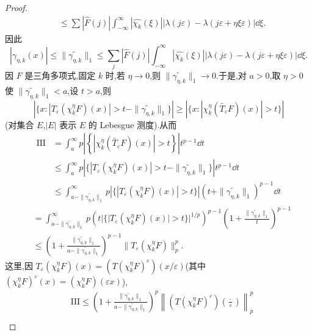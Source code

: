 \begin{proof}
\begin{align*}
&\leq \sum\left|\widehat{F}(j)\right|\int_{-\infty}^{\infty}|\widehat{\chi_k}(\xi)||\lambda(j\varepsilon) - \lambda(j\varepsilon + \eta\xi\varepsilon)|\dd\xi.
\end{align*}
因此
\begin{equation*}
|\gamma_{\eta,k}(x)| \leq \|\widetilde{\gamma_{\eta,k}}\|_{1} \leq \sum_j\left|\widehat{F}(j)\right|\int_{-\infty}^{\infty}|\widehat{\chi_k}(\xi)||\lambda(j\varepsilon) - \lambda(j\varepsilon + \eta\xi\varepsilon)|\dd\xi.
\end{equation*}
因 $F$ 是三角多项式,固定 $k$ 时,若 $\eta \to 0$,则 $\|\widetilde{\gamma_{\eta,k}}\|_{1} \to 0$.于是,对 $a > 0$,取 $\eta > 0$ 使 $\|\widetilde{\gamma_{\eta,k}}\|_{1} < a$,设 $t > a$,则
\begin{equation*}
\left|\{x: |T_{\varepsilon}(\chi_k^\eta F)(x)| > t - \|\widetilde{\gamma_{\eta,k}}\|_{1}\}\right| \geq \left|\{x: |\chi_k^\eta(\widetilde{T_{\varepsilon}}F)(x)| > t\}\right|
\end{equation*}
(对集合 $E$,$|E|$ 表示 $E$ 的 Lebesgue 测度).从而
\begin{align*}
\mathrm{III} &= \int_{a}^{\infty}p\left|\left\{\left|\chi_k^\eta(\widetilde{T_{\varepsilon}}F)(x)\right| > t\right\}\right|t^{p-1}\dd t\\
&\leq \int_{a}^{\infty}p\left|\{|T_{\varepsilon}(\chi_k^\eta F)(x)| > t - \|\widetilde{\gamma_{\eta,k}}\|_{1}\}\right|t^{p-1}\dd t\\
&\leq \int_{a - \|\widetilde{\gamma_{\eta,k}}\|_{1}}^{\infty}p\left|\{|T_{\varepsilon}(\chi_k^\eta F)(x)| > t\}\right|(t + \|\widetilde{\gamma_{\eta,k}}\|_{1})^{p-1}\dd t
\end{align*}
\begin{align*}
&= \int_{a - \|\widetilde{\gamma_{\eta,k}}\|_{1}}^{\infty}p\left(t|\{|T_{\varepsilon}(\chi_k^\eta F)(x)| > t\}|^{1/p}\right)^{p-1}\left(1 + \frac{\|\widetilde{\gamma_{\eta,k}}\|_{1}}{t}\right)^{p-1}\\
&\leq \left(1 + \frac{\|\widetilde{\gamma_{\eta,k}}\|_{1}}{a - \|\widetilde{\gamma_{\eta,k}}\|_{1}}\right)^{p-1}\|T_{\varepsilon}(\chi_k^\eta F)\|_{p}^{p}.
\end{align*}
这里,因 $T_{\varepsilon}(\chi_{k}^{\eta}F)(x) = (T(\chi_{k}^{\eta}F)^{\varepsilon})(x/\varepsilon)$(其中 $(\chi_{k}^{\eta}F)^{\varepsilon}(x) = (\chi_{k}^{\eta}F)(\varepsilon x)$),
\begin{align*}
&\mathrm{III} \leq \left(1 + \frac{\|\widetilde{\gamma_{\eta,k}}\|_{1}}{a - \|\widetilde{\gamma_{\eta,k}}\|_{1}}\right)^{p}\left\|(T(\chi_{k}^{\eta}F)^{\varepsilon})\left(\frac{\cdot}{\varepsilon}\right)\right\|_{p}^{p}\\

\end{align*}
\end{proof}
